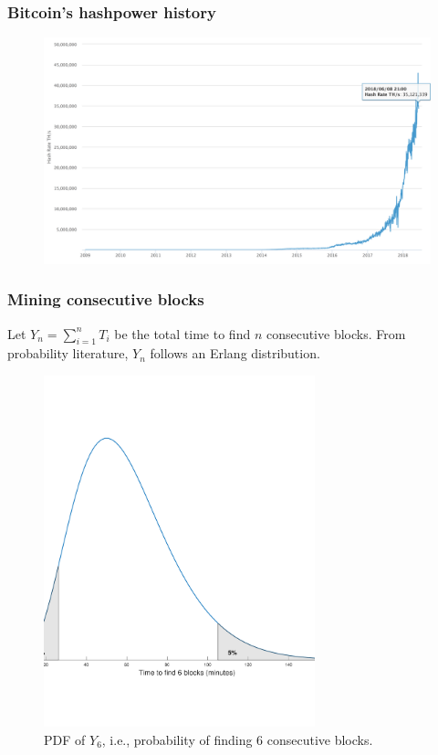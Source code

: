 \documentclass{beamer}
\begin{document}
\begin{frame}
\frametitle{Bitcoin's hashpower history}
\begin{figure}
\includegraphics[width=\textwidth]{./images-defense/bitcoin-H-history.png}
\end{figure}
\end{frame}


\begin{frame}
\frametitle{Mining consecutive blocks}

Let $Y_n = \sum_{i=1}^n T_i$ be the total time to find $n$ consecutive blocks. From probability literature, $Y_n$ follows an Erlang distribution.

\begin{figure}
\includegraphics[width=0.7\textwidth]{./images01/time-6-blocks.pdf}
\caption{PDF of $Y_6$, i.e., probability of finding 6 consecutive blocks.}
\end{figure}

\end{frame}
\end{document}
